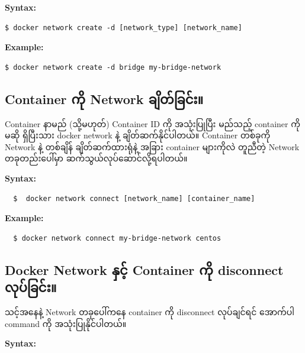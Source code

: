 \textbf{Syntax:}

\begin{verbatim}
$ docker network create -d [network_type] [network_name]
\end{verbatim}

\textbf{Example:}

\begin{verbatim}
$ docker network create -d bridge my-bridge-network
\end{verbatim}

\hypertarget{container-ux1000ux102dux102f-network-ux1001ux103bux102dux1010ux103aux1001ux103cux1004ux103aux1038-1}{%
\subsection{Container ကို Network
ချိတ်ခြင်း။}\label{container-ux1000ux102dux102f-network-ux1001ux103bux102dux1010ux103aux1001ux103cux1004ux103aux1038-1}}

Container နာမည် (သို့မဟုတ်) Container ID ကို အသုံးပြုပြီး မည်သည့်
container ကိုမဆို ရှိပြီးသား docker network နဲ့ ချိတ်ဆက်နိုင်ပါတယ်။
Container တစ်ခုကို Network နဲ့ တစ်ချိန် ချိတ်ဆက်ထားရုံနဲ့ အခြား
container များကိုလဲ တူညီတဲ့ Network တခုတည်းပေါ်မှာ
ဆက်သွယ်လုပ်ဆောင်လို့ရပါတယ်။

\textbf{Syntax:}

\begin{verbatim}
  $  docker network connect [network_name] [container_name]
\end{verbatim}

\textbf{Example:}

\begin{verbatim}
  $ docker network connect my-bridge-network centos
\end{verbatim}

\hypertarget{docker-network-ux1014ux103eux1004ux103aux1037-container-ux1000ux102dux102f-disconnect-ux101cux102fux1015ux103aux1001ux103cux1004ux103aux1038-1}{%
\subsection{Docker Network နှင့် Container ကို disconnect
လုပ်ခြင်း။}\label{docker-network-ux1014ux103eux1004ux103aux1037-container-ux1000ux102dux102f-disconnect-ux101cux102fux1015ux103aux1001ux103cux1004ux103aux1038-1}}

သင့်အနေနဲ့ Network တခုပေါ်ကနေ container ကို disconnect လုပ်ချင်ရင်
အောက်ပါ command ကို အသုံးပြုနိုင်ပါတယ်။

\textbf{Syntax:}

